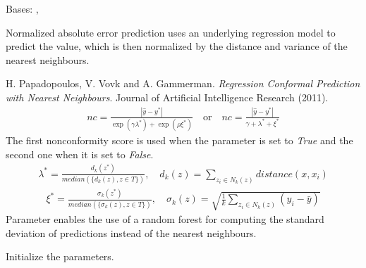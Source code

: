 \documentclass[letterpaper,10pt,english]{sphinxmanual}
\begin{document}
\begin{fulllineitems}
\label{cp.nonconformity:cp.nonconformity.AbsErrorNormalized}
Bases: {\hyperref[cp.nonconformity:cp.nonconformity.RegrModelNC]{}}, {\hyperref[cp.nonconformity:cp.nonconformity.NearestNeighbours]{}}

Normalized absolute error prediction uses an underlying regression model to predict the value,
which is then normalized by the distance and variance of the nearest neighbours.

H. Papadopoulos, V. Vovk and A. Gammerman. \emph{Regression Conformal Prediction with Nearest Neighbours}.
Journal of Artificial Intelligence Research (2011).
\begin{equation*}
\begin{split}\mathit{nc} = \frac{|\hat{y}-y^{*}|}{\exp(\gamma \lambda^*) + \exp(\rho \xi^*)}
\quad \text{or} \quad
\mathit{nc} = \frac{|\hat{y}-y^{*}|}{\gamma + \lambda^* + \xi^*}\end{split}
\end{equation*}
The first nonconformity score is used when the parameter  is set to \emph{True}
and the second one when it is set to \emph{False}.
\begin{equation*}
\begin{split}\lambda^* = \frac{d_k(z^*)}{\mathit{median}(\{d_k(z), z \in T\})}, \quad
d_k(z) = \sum_{z_i \in N_k(z)} distance(x, x_i)\end{split}
\end{equation*}\begin{equation*}
\begin{split}\xi^* = \frac{\sigma_k(z^*)}{\mathit{median}(\{\sigma_k(z), z \in T\})}, \quad
\sigma_k(z) = \sqrt{\frac{1}{k} \sum_{z_i \in N_k(z)}(y_i-\bar{y})}\end{split}
\end{equation*}
Parameter  enables the use of a random forest for computing the standard deviation
of predictions instead of the nearest neighbours.

\begin{fulllineitems}
\label{cp.nonconformity:cp.nonconformity.AbsErrorNormalized.__init__}
Initialize the parameters.


\end{fulllineitems}
\end{fulllineitems}
\end{document}
